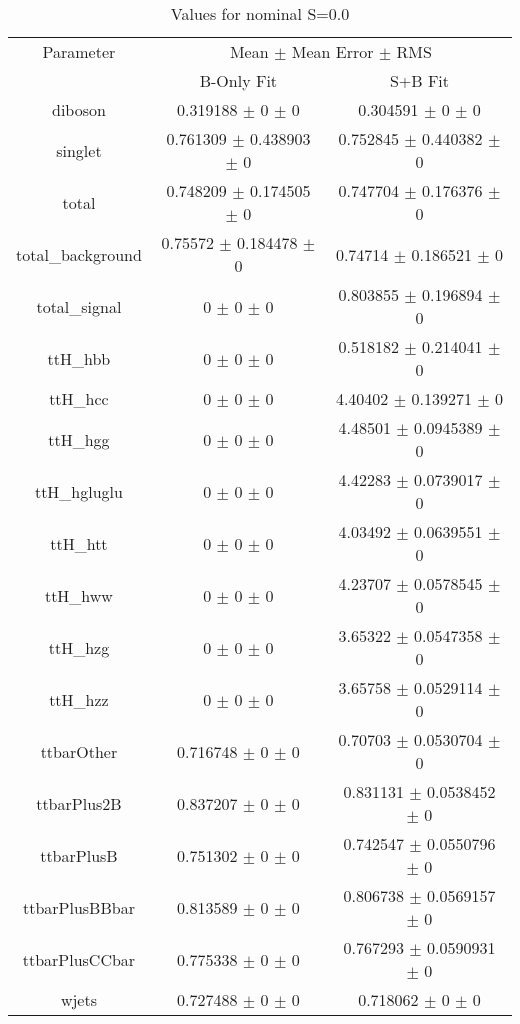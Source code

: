 \begin{table}
\centering
\caption{Values for nominal S=0.0}
\begin{tabular}{ccc}
\toprule
Parameter & \multicolumn{2}{c}{Mean $\pm$ Mean Error $\pm$ RMS}\\
 & B-Only Fit & S+B Fit\\
\midrule
diboson & \num{0.319188} $\pm$ \num{0} $\pm$ \num{0} & \num{0.304591} $\pm$ \num{0} $\pm$ \num{0}\\
singlet & \num{0.761309} $\pm$ \num{0.438903} $\pm$ \num{0} & \num{0.752845} $\pm$ \num{0.440382} $\pm$ \num{0}\\
total & \num{0.748209} $\pm$ \num{0.174505} $\pm$ \num{0} & \num{0.747704} $\pm$ \num{0.176376} $\pm$ \num{0}\\
total\_background & \num{0.75572} $\pm$ \num{0.184478} $\pm$ \num{0} & \num{0.74714} $\pm$ \num{0.186521} $\pm$ \num{0}\\
total\_signal & \num{0} $\pm$ \num{0} $\pm$ \num{0} & \num{0.803855} $\pm$ \num{0.196894} $\pm$ \num{0}\\
ttH\_hbb & \num{0} $\pm$ \num{0} $\pm$ \num{0} & \num{0.518182} $\pm$ \num{0.214041} $\pm$ \num{0}\\
ttH\_hcc & \num{0} $\pm$ \num{0} $\pm$ \num{0} & \num{4.40402} $\pm$ \num{0.139271} $\pm$ \num{0}\\
ttH\_hgg & \num{0} $\pm$ \num{0} $\pm$ \num{0} & \num{4.48501} $\pm$ \num{0.0945389} $\pm$ \num{0}\\
ttH\_hgluglu & \num{0} $\pm$ \num{0} $\pm$ \num{0} & \num{4.42283} $\pm$ \num{0.0739017} $\pm$ \num{0}\\
ttH\_htt & \num{0} $\pm$ \num{0} $\pm$ \num{0} & \num{4.03492} $\pm$ \num{0.0639551} $\pm$ \num{0}\\
ttH\_hww & \num{0} $\pm$ \num{0} $\pm$ \num{0} & \num{4.23707} $\pm$ \num{0.0578545} $\pm$ \num{0}\\
ttH\_hzg & \num{0} $\pm$ \num{0} $\pm$ \num{0} & \num{3.65322} $\pm$ \num{0.0547358} $\pm$ \num{0}\\
ttH\_hzz & \num{0} $\pm$ \num{0} $\pm$ \num{0} & \num{3.65758} $\pm$ \num{0.0529114} $\pm$ \num{0}\\
ttbarOther & \num{0.716748} $\pm$ \num{0} $\pm$ \num{0} & \num{0.70703} $\pm$ \num{0.0530704} $\pm$ \num{0}\\
ttbarPlus2B & \num{0.837207} $\pm$ \num{0} $\pm$ \num{0} & \num{0.831131} $\pm$ \num{0.0538452} $\pm$ \num{0}\\
ttbarPlusB & \num{0.751302} $\pm$ \num{0} $\pm$ \num{0} & \num{0.742547} $\pm$ \num{0.0550796} $\pm$ \num{0}\\
ttbarPlusBBbar & \num{0.813589} $\pm$ \num{0} $\pm$ \num{0} & \num{0.806738} $\pm$ \num{0.0569157} $\pm$ \num{0}\\
ttbarPlusCCbar & \num{0.775338} $\pm$ \num{0} $\pm$ \num{0} & \num{0.767293} $\pm$ \num{0.0590931} $\pm$ \num{0}\\
wjets & \num{0.727488} $\pm$ \num{0} $\pm$ \num{0} & \num{0.718062} $\pm$ \num{0} $\pm$ \num{0}\\
\bottomrule
\end{tabular}
\end{table}